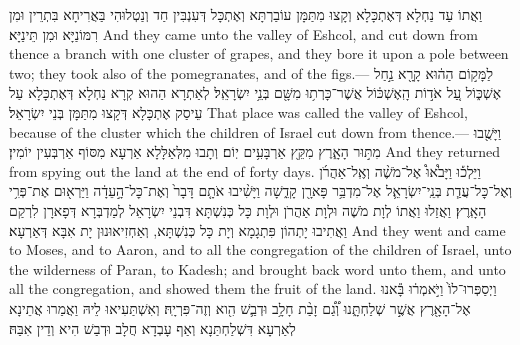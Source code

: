{וַאֲתוֹ עַד נַחְלָא דְּאֶתְכָּלָא וְקָצוּ מִתַּמָּן עוֹבַרְתָּא וְאֶתְכָּל דְּעִנְבִּין חַד וְנַטְלוּהִי בַּאֲרִיחָא בִּתְרֵין וּמִן רִמּוֹנַיָּא וּמִן תֵּינַיָּא׃}
{And they came unto the valley of Eshcol, and cut down from thence a branch with one cluster of grapes, and they bore it upon a pole between two; they took also of the pomegranates, and of the figs.—}{}
{לַמָּק֣וֹם הַה֔וּא קָרָ֖א נַ֣חַל אֶשְׁכּ֑וֹל עַ֚ל אֹד֣וֹת הָֽאֶשְׁכּ֔וֹל אֲשֶׁר־כָּרְת֥וּ מִשָּׁ֖ם בְּנֵ֥י יִשְׂרָאֵֽל׃}
{לְאַתְרָא הַהוּא קְרָא נַחְלָא דְּאֶתְכָּלָא עַל עֵיסַק אֶתְכָּלָא דְּקָצוּ מִתַּמָּן בְּנֵי יִשְׂרָאֵל׃}
{That place was called the valley of Eshcol, because of the cluster which the children of Israel cut down from thence.—}{}
{וַיָּשֻׁ֖בוּ מִתּ֣וּר הָאָ֑רֶץ מִקֵּ֖ץ אַרְבָּעִ֥ים יֽוֹם׃
}
{וְתָבוּ מִלְּאַלָּלָא אַרְעָא מִסּוֹף אַרְבְּעִין יוֹמִין׃}
{And they returned from spying out the land at the end of forty days.}{}
{וַיֵּלְכ֡וּ וַיָּבֹ֩אוּ֩ אֶל־מֹשֶׁ֨ה וְאֶֽל־אַהֲרֹ֜ן וְאֶל־כׇּל־עֲדַ֧ת בְּנֵֽי־יִשְׂרָאֵ֛ל אֶל־מִדְבַּ֥ר פָּארָ֖ן קָדֵ֑שָׁה וַיָּשִׁ֨יבוּ אֹתָ֤ם דָּבָר֙ וְאֶת־כׇּל־הָ֣עֵדָ֔ה וַיַּרְא֖וּם אֶת־פְּרִ֥י הָאָֽרֶץ׃
}
{ וַאֲזַלוּ וַאֲתוֹ לְוָת מֹשֶׁה וּלְוָת אַהֲרֹן וּלְוָת כָּל כְּנִשְׁתָּא דִּבְנֵי יִשְׂרָאֵל לְמַדְבְּרָא דְּפָארָן לִרְקַם וַאֲתִיבוּ יָתְהוֹן פִּתְגָמָא וְיָת כָּל כְּנִשְׁתָּא, וְאַחְזִיאוּנוּן יָת אִבָּא דְּאַרְעָא׃}
{And they went and came to Moses, and to Aaron, and to all the congregation of the children of Israel, unto the wilderness of Paran, to Kadesh; and brought back word unto them, and unto all the congregation, and showed them the fruit of the land.}{}
{וַיְסַפְּרוּ־לוֹ֙ וַיֹּ֣אמְר֔וּ בָּ֕אנוּ אֶל־הָאָ֖רֶץ אֲשֶׁ֣ר שְׁלַחְתָּ֑נוּ וְ֠גַ֠ם זָבַ֨ת חָלָ֥ב וּדְבַ֛שׁ הִ֖וא וְזֶה־פִּרְיָֽהּ׃
}
{וְאִשְׁתַּעִיאוּ לֵיהּ וַאֲמַרוּ אֲתֵינָא לְאַרְעָא דִּשְׁלַחְתַּנָא וְאַף עָבְדָא חֲלָב וּדְבַשׁ הִיא וְדֵין אִבַּהּ׃}
